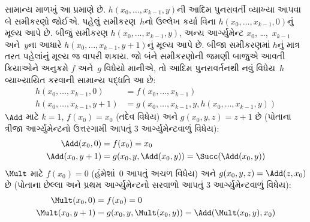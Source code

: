 \documentclass[../../../include/open-logic-section]{subfiles}
\begin{document}
સામાન્ય માળખું આ પ્રમાણે છે. $h(x_0, \dots, x_{k-1}, y)$ની આદિમ
પુનરાવર્તી વ્યાખ્યા આપવા બે સમીકરણો જોઈએ. પહેલું સમીકરણ~$h$નો
ઉલ્લેખ કર્યા વિના $h(x_0, \dots, x_{k-1}, 0)$નું મૂલ્ય આપે છે.
બીજું સમીકરણ $h(x_0, \dots, x_{k-1}, y)$, અન્ય આર્ગ્યુમેન્ટ
$x_0$, \dots,~$x_{k-1}$ અને~$y$ના આધારે
$h(x_0, \dots, x_{k-1}, y+1)$નું મૂલ્ય આપે છે. બીજા સમીકરણમાં
$h$નું માત્ર તરત પહેલાંનું મૂલ્ય જ વાપરી શકાય. જો બંને સમીકરણોની
જમણી બાજુએ આવતી ક્રિયાઓને અનુક્રમે $f$ અને~$g$ વિધેયો માનીએ,
તો આદિમ પુનરાવર્તનથી નવું વિધેય~$h$ વ્યાખ્યાયિત કરવાની સામાન્ય
પદ્ધતિ આ છે:
\begin{align*}
  h(x_0, \dots, x_{k-1}, 0) & = f(x_0, \dots, x_{k-1})\\
  h(x_0, \dots, x_{k-1}, y+1) & =
  g(x_0, \dots, x_{k-1}, y, h(x_0, \dots, x_{k-1}, y))
\end{align*}
$\Add$ માટે $k=1$, $f(x_0) = x_0$ (તદેવ વિધેય) અને
$g(x_0, y, z) = z + 1$ છે (પોતાના ત્રીજા આર્ગ્યુમેન્ટનો ઉત્તરગામી
આપતું $3$ આર્ગ્યુમેન્ટવાળું વિધેય):
\begin{align*}
  \Add(x_0, 0) & = f(x_0) = x_0\\
  \Add(x_0, y+1) & = g(x_0, y, \Add(x_0, y)) =
  \Succ(\Add(x_0, y))
\end{align*}
$\Mult$ માટે $f(x_0) = 0$ (હંમેશાં~$0$ આપતું અચળ વિધેય) અને
$g(x_0, y, z) = \Add(z,x_0)$ છે (પોતાના છેલ્લા અને પ્રથમ
આર્ગ્યુમેન્ટનો સરવાળો આપતું $3$ આર્ગ્યુમેન્ટવાળું વિધેય):
\begin{align*}
  \Mult(x_0,0) & =  f(x_0) = 0 \\
  \Mult(x_0,y+1) & =  g(x_0, y, \Mult(x_0,y)) =
  \Add(\Mult(x_0,y), x_0)
\end{align*}
\end{document}
